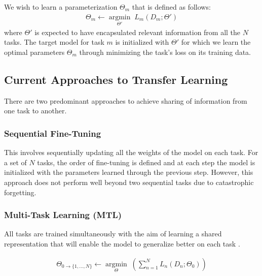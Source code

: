\begin{definition}
We wish to learn a parameterization $\Theta_m$ that is defined as follows:
\begin{gather*}
    \Theta_m \leftarrow \underset{\Theta'}{\operatorname{argmin}}\;L_m(D_m;\Theta') 
\end{gather*}
where $\Theta'$ is expected to have encapsulated relevant information from all the $N$ tasks. The target model for task $m$ is initialized with $\Theta'$ for which we learn the optimal parameters  $\Theta_m$  through minimizing the task's loss on its training data.  
\end{definition}

\subsection{Current Approaches to Transfer Learning}
\label{sec:Current_approaches}

There are two predominant approaches to achieve sharing of information from one task to another.

\subsubsection{Sequential Fine-Tuning} This involves sequentially updating all the weights of the model on each task. For a set of $N$ tasks, the order of fine-tuning is defined and at each step  the model is initialized with the parameters learned through the previous step. However, this approach does not perform well beyond two sequential tasks \cite{phang2018sentence, pruksachatkun2020intermediate} due to catastrophic forgetting.

\subsubsection{Multi-Task Learning (MTL)} All tasks are trained simultaneously with the aim of learning a shared representation that will enable the model to generalize better on each task \cite[][\textit{inter alia}]{caruana1997multitask, collobert2008unified, nam2014large, liu2016recurrent,  liu2017adversarial, zhang2017survey, ruder2017, ruder2019latent, sanh2019hierarchical, pfeiffer20multilabel}.

\begin{equation*}
\begin{split}
    \Theta_{0 \rightarrow \{1, ..., N\}} \leftarrow \underset{\Theta}{\operatorname{argmin}}\; \left( \sum_{n=1}^N L_n(D_n;\Theta_0)  \right)
\end{split}
\end{equation*}

